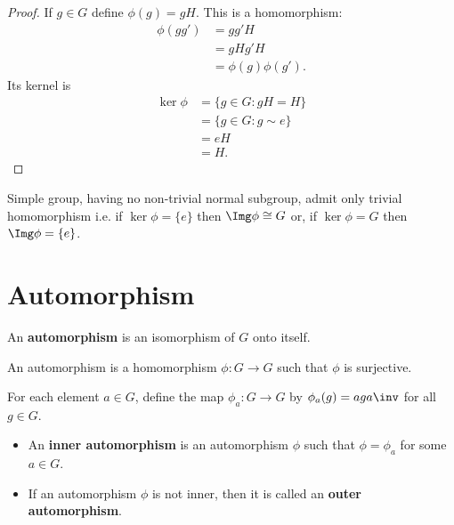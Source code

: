 \documentclass[12pt, a4paper]{article}
\begin{document}
\begin{proof}
    If \(g \in G\) define \(\phi(g)=gH\). This is a homomorphism: 
    \[\begin{aligned}
        \phi(gg')&=gg'H \\
        &=gHg'H \\
        &=\phi(g)\phi(g').
    \end{aligned}\]
    Its kernel is 
    \[\begin{aligned}
        \ker\phi&=\{g \in G :gH=H\} \\
        &= \{g \in G : g \sim e\} \\
        &= eH \\
        &= H.
    \end{aligned}\]
\end{proof}

\begin{corollary}
    Simple group, having no non-trivial normal subgroup, admit only trivial homomorphism i.e. if \(\ker \phi = \{e\}\) then 
    \(\Img \phi \cong G\) or, if \(\ker \phi = G\) then \(\Img \phi =\{e\}\).
\end{corollary}

\pagebreak

\section{Automorphism}

\begin{definition}
    An \textbf{automorphism} is an isomorphism of \(G\) onto itself.
\end{definition}

\begin{mdnote}
    An automorphism is a homomorphism \(\phi : G\to G\) such that \(\phi\) is surjective.
\end{mdnote}

\begin{definition}
    For each element \(a\in G\), define the map \(\phi_a :G\to G\) by \(\phi_a(g)=aga\inv\) for all \(g\in G\).
    \begin{itemize}
        \item An \textbf{inner automorphism} is an automorphism \(\phi\) such that \(\phi=\phi_a\) for some \(a\in G\).
        \item If an automorphism \(\phi\) is not inner, then it is called an \textbf{outer automorphism}.
    \end{itemize}
\end{definition}
\end{document}
